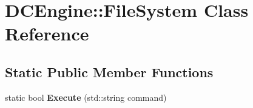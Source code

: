 \hypertarget{classDCEngine_1_1FileSystem}{\section{D\-C\-Engine\-:\-:File\-System Class Reference}
\label{classDCEngine_1_1FileSystem}
}
\subsection*{Static Public Member Functions}
\begin{DoxyCompactItemize}
\item 
\hypertarget{classDCEngine_1_1FileSystem_a9bf1b81ba166486fb019c8d9399dd69c}{static bool {\bfseries Execute} (std\-::string command)}\label{classDCEngine_1_1FileSystem_a9bf1b81ba166486fb019c8d9399dd69c}


\end{DoxyCompactItemize}
